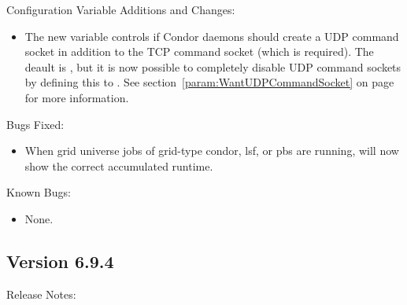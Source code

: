 \noindent Configuration Variable Additions and Changes:

\begin{itemize}

\item The new variable  controls
  if Condor daemons should create a UDP command socket in addition to
  the TCP command socket (which is required).
  The deault is , but it is now possible to completely
  disable UDP command sockets by defining this to .
  See section~\ref{param:WantUDPCommandSocket} on
  page~\pageref{param:WantUDPCommandSocket} for more information.

\end{itemize}

\noindent Bugs Fixed:

\begin{itemize}

\item When grid universe jobs of grid-type condor, lsf, or pbs are running,
 will now show the correct accumulated runtime.

\end{itemize}

\noindent Known Bugs:

\begin{itemize}

\item None.

\end{itemize}


\subsection*{\label{sec:New-6-9-4}Version 6.9.4}

\noindent Release Notes:

